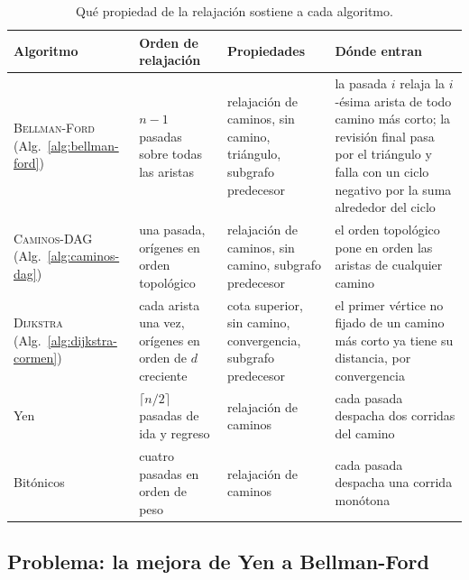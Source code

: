 \documentclass[11pt,letterpaper]{article}
\begin{document}
\begin{table}[htbp]
  \centering
  \small
  \begin{tabular}{>{\raggedright\arraybackslash}p{2.6cm}
                  >{\raggedright\arraybackslash}p{3.2cm}
                  >{\raggedright\arraybackslash}p{3.7cm}
                  >{\raggedright\arraybackslash}p{4.9cm}}
    \toprule
    \textbf{Algoritmo} & \textbf{Orden de relajación}
      & \textbf{Propiedades} & \textbf{Dónde entran} \\
    \midrule
    \textsc{Bellman-Ford} (Alg.~\ref{alg:bellman-ford})
      & $n - 1$ pasadas sobre todas las aristas
      & relajación de caminos, sin camino, triángulo, subgrafo
        predecesor
      & la pasada $i$ relaja la $i$-ésima arista de todo camino más
        corto; la revisión final pasa por el triángulo y falla con un
        ciclo negativo por la suma alrededor del ciclo \\
    \addlinespace
    \textsc{Caminos-DAG} (Alg.~\ref{alg:caminos-dag})
      & una pasada, orígenes en orden topológico
      & relajación de caminos, sin camino, subgrafo predecesor
      & el orden topológico pone en orden las aristas de cualquier
        camino \\
    \addlinespace
    \textsc{Dijkstra} (Alg.~\ref{alg:dijkstra-cormen})
      & cada arista una vez, orígenes en orden de $d$ creciente
      & cota superior, sin camino, convergencia, subgrafo predecesor
      & el primer vértice no fijado de un camino más corto ya tiene su
        distancia, por convergencia \\
    \addlinespace
    Yen
      & $\lceil n/2 \rceil$ pasadas de ida y regreso
      & relajación de caminos
      & cada pasada despacha dos corridas del camino \\
    \addlinespace
    Bitónicos
      & cuatro pasadas en orden de peso
      & relajación de caminos
      & cada pasada despacha una corrida monótona \\
    \bottomrule
  \end{tabular}
  \caption{Qué propiedad de la relajación sostiene a cada algoritmo.}
  \label{tab:caminos-quien-usa}
\end{table}


\subsection*{Problema: la mejora de Yen a Bellman-Ford}
\end{document}
